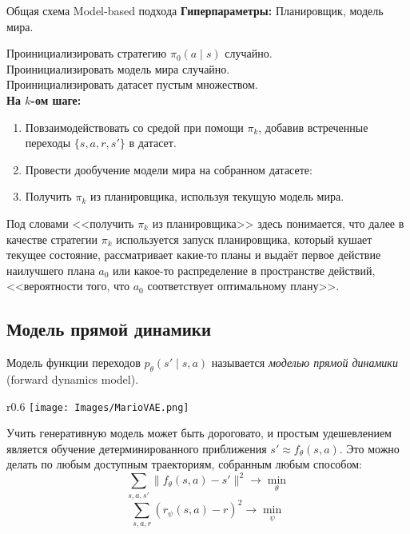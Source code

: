 \begin{algorithm}[label = alg:generalmodelbased]{Общая схема Model-based подхода}
\textbf{Гиперпараметры:} Планировщик, модель мира.

\vspace{0.3cm}
Проинициализировать стратегию $\pi_0(a \mid s)$ случайно. \\
Проинициализировать модель мира случайно. \\
Проинициализировать датасет пустым множеством. \\
\textbf{На $k$-ом шаге:}
\begin{enumerate}
    \item Повзаимодействовать со средой при помощи $\pi_k$, добавив встреченные переходы $\{s, a, r, s'\}$ в датасет.
    \item Провести дообучение модели мира на собранном датасете:
    \item Получить $\pi_k$ из планировщика, используя текущую модель мира.
\end{enumerate}
\end{algorithm}

Под словами <<получить $\pi_k$ из планировщика>> здесь понимается, что далее в качестве стратегии $\pi_k$ используется запуск планировщика, который кушает текущее состояние, рассматривает какие-то планы и выдаёт первое действие наилучшего плана $a_0$ или какое-то распределение в пространстве действий, <<вероятности того, что $a_0$ соответствует оптимальному плану>>.

\subsection{Модель прямой динамики}

\begin{definition}
Модель функции переходов $p_\theta(s' \mid s, a)$ называется \emph{моделью прямой динамики} (forward dynamics model).
\end{definition}

\begin{wrapfigure}{r}{0.6\textwidth}
\vspace{-0.5cm}
\centering
\texttt{[image: Images/MarioVAE.png]}
\vspace{-0.5cm}
\end{wrapfigure}

Учить генеративную модель может быть дороговато, и простым удешевлением является обучение детерминированного приближения $s' \approx f_\theta(s, a)$. Это можно делать по любым доступным траекториям, собранным любым способом:
$$\sum_{s, a, s'} \|f_\theta(s, a) - s'\|^2 \to \min_\theta$$
$$\sum_{s, a, r} \left( r_\psi(s, a) - r \right)^2 \to \min_\psi$$

